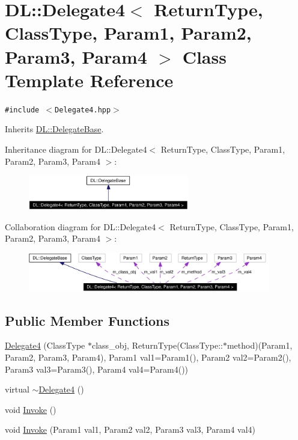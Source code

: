 \hypertarget{classDL_1_1Delegate4}{
\section{DL::Delegate4$<$ Return\-Type, Class\-Type, Param1, Param2, Param3, Param4 $>$ Class Template Reference}
\label{classDL_1_1Delegate4}
}
{\tt \#include $<$Delegate4.hpp$>$}

Inherits \hyperlink{classDL_1_1DelegateBase}{DL::Delegate\-Base}.

Inheritance diagram for DL::Delegate4$<$ Return\-Type, Class\-Type, Param1, Param2, Param3, Param4 $>$:\begin{figure}[H]
\begin{center}
\leavevmode
\includegraphics[width=199pt]{classDL_1_1Delegate4__inherit__graph}
\end{center}
\end{figure}
Collaboration diagram for DL::Delegate4$<$ Return\-Type, Class\-Type, Param1, Param2, Param3, Param4 $>$:\begin{figure}[H]
\begin{center}
\leavevmode
\includegraphics[width=300pt]{classDL_1_1Delegate4__coll__graph}
\end{center}
\end{figure}
\subsection*{Public Member Functions}
\begin{CompactItemize}
\item 
\hyperlink{classDL_1_1Delegate4_a0}{Delegate4} (Class\-Type $\ast$class\_\-obj, Return\-Type(Class\-Type::$\ast$method)(Param1, Param2, Param3, Param4), Param1 val1=Param1(), Param2 val2=Param2(), Param3 val3=Param3(), Param4 val4=Param4())
\item 
virtual \hyperlink{classDL_1_1Delegate4_a1}{$\sim$Delegate4} ()
\item 
void \hyperlink{classDL_1_1Delegate4_a2}{Invoke} ()
\item 
void \hyperlink{classDL_1_1Delegate4_a3}{Invoke} (Param1 val1, Param2 val2, Param3 val3, Param4 val4)
\end{CompactItemize}
